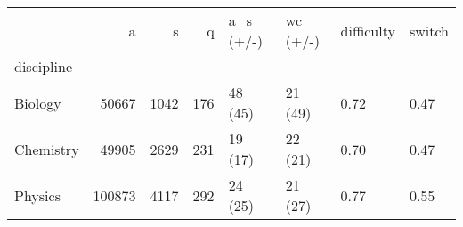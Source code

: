 \begin{tabular}{lrrrllll}
\toprule
{} &       a &     s &    q & a\_s (+/-) & wc (+/-) & difficulty & switch \\
discipline &         &       &      &           &          &            &        \\
\midrule
Biology    &   50667 &  1042 &  176 &   48 (45) &  21 (49) &       0.72 &   0.47 \\
Chemistry  &   49905 &  2629 &  231 &   19 (17) &  22 (21) &       0.70 &   0.47 \\
Physics    &  100873 &  4117 &  292 &   24 (25) &  21 (27) &       0.77 &   0.55 \\
\bottomrule
\end{tabular}
